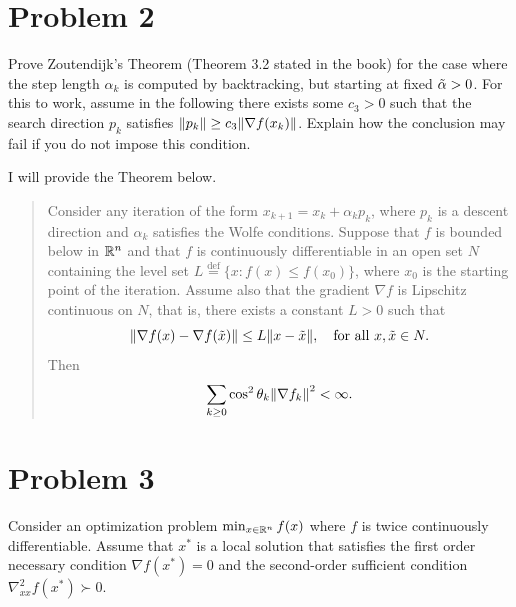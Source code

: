 \section{Problem 2}
Prove Zoutendijk's Theorem (Theorem 3.2 stated in the book) for the case where the step length $\alpha_k$ is computed by backtracking, but starting at fixed $\Tilde{\alpha} > 0$. For this to work, assume in the following there exists some $c_3 > 0$ such that the search direction $p_k$ satisfies $\norm{p_k} \geq c_3 \norm{\nabla f(x_k)}$. Explain how the conclusion may fail if you do not impose this condition.
\partbreak
\begin{solution}

    I will provide the Theorem below.
    \tightalignbreak
    \begin{quote}
        Consider any iteration of the form $x_{k+1} = x_k + \alpha_k p_k$, where $p_k$ is a descent direction and $\alpha_k$ satisfies the Wolfe conditions. Suppose that $f$ is bounded below in $\mathbb{R}^n$ and that $f$ is continuously differentiable in an open set $N$ containing the level set $L \stackrel{\text{def}}{=} \{ x : f(x) \leq f(x_0)\}$, where $x_0$ is the starting point of the iteration. Assume also that the gradient $\nabla f$ is Lipschitz continuous on $N$, that is, there exists a constant $L > 0$ such that 
        \[\norm{\nabla f(x) - \nabla f(\Tilde{x})} \leq L\norm{x - \Tilde{x}}, \quad \text{for all } x, \Tilde{x} \in N.\]
        Then
        \[\sum_{k \geq 0} \cos^2\theta_k \norm{\nabla f_k}^2 < \infty.\]
    \end{quote}
    \vspace{-6mm}\alignbreak

    
\end{solution}

\newpage
\section{Problem 3}
Consider an optimization problem $\min_{x \in \mathbb{R}^n} f(x)$ where $f$ is twice continuously differentiable. Assume that $x^*$ is a local solution that satisfies the first order necessary condition $\nabla f(x^*) = 0$ and the second-order sufficient condition $\nabla_{xx}^2f(x^*) \succ 0$.
